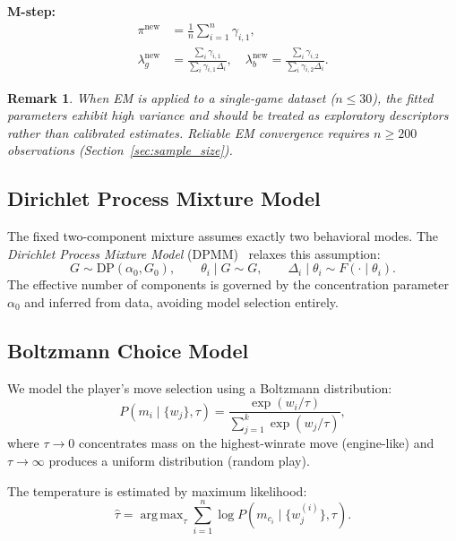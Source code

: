 \documentclass[11pt,a4paper]{article}
\newtheorem{remark}{Remark}
\DeclareMathOperator*{\argmax}{arg\,max}
\begin{document}
\textbf{M-step:}
\begin{align}
    \pi^{\text{new}} &= \frac{1}{n}\sum_{i=1}^{n} \gamma_{i,1},
    \label{eq:m_step_pi}\\
    \lambda_g^{\text{new}} &= \frac{\sum_i \gamma_{i,1}}
    {\sum_i \gamma_{i,1} \Delta_i}, \quad
    \lambda_b^{\text{new}} = \frac{\sum_i \gamma_{i,2}}
    {\sum_i \gamma_{i,2} \Delta_i}.
    \label{eq:m_step_lambda}
\end{align}

\begin{remark}
When EM is applied to a single-game dataset ($n \leq 30$), the fitted
parameters exhibit high variance and should be treated as exploratory
descriptors rather than calibrated estimates. Reliable EM convergence
requires $n \geq 200$ observations (Section~\ref{sec:sample_size}).
\end{remark}

\subsection{Dirichlet Process Mixture Model}
\label{sec:dpm}

The fixed two-component mixture assumes exactly two behavioral modes.
The \emph{Dirichlet Process Mixture Model} (DPMM)~\citep{ferguson1973bayesian,
neal2000markov} relaxes this assumption:
\begin{equation}
    G \sim \text{DP}(\alpha_0, G_0), \qquad
    \theta_i \mid G \sim G, \qquad
    \Delta_i \mid \theta_i \sim F(\cdot \mid \theta_i).
\end{equation}
The effective number of components is governed by the concentration parameter
$\alpha_0$ and inferred from data, avoiding model selection entirely.

\subsection{Boltzmann Choice Model}
\label{sec:softmax}

We model the player's move selection using a Boltzmann distribution:
\begin{equation}
    P(m_i \mid \{w_j\}, \tau) = \frac{\exp(w_i / \tau)}{\sum_{j=1}^{k}
    \exp(w_j / \tau)},
    \label{eq:softmax}
\end{equation}
where $\tau \to 0$ concentrates mass on the highest-winrate move (engine-like)
and $\tau \to \infty$ produces a uniform distribution (random play).

The temperature is estimated by maximum likelihood:
\begin{equation}
    \hat{\tau} = \argmax_{\tau} \sum_{i=1}^{n} \log P(m_{c_i} \mid
    \{w_j^{(i)}\}, \tau).
\end{equation}
\end{document}
